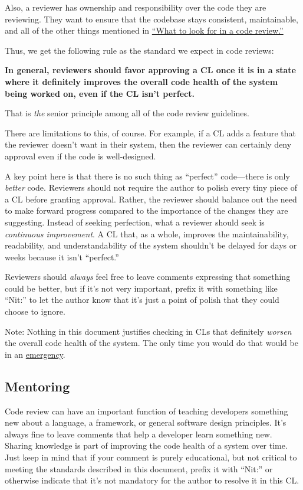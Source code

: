 \documentclass[
]{article}
\begin{document}
Also, a reviewer has ownership and responsibility over the code they are
reviewing. They want to ensure that the codebase stays consistent,
maintainable, and all of the other things mentioned in
\href{looking-for.md}{``What to look for in a code review.''}

Thus, we get the following rule as the standard we expect in code
reviews:

\textbf{In general, reviewers should favor approving a CL once it is in
a state where it definitely improves the overall code health of the
system being worked on, even if the CL isn't perfect.}

That is \emph{the} senior principle among all of the code review
guidelines.

There are limitations to this, of course. For example, if a CL adds a
feature that the reviewer doesn't want in their system, then the
reviewer can certainly deny approval even if the code is well-designed.

A key point here is that there is no such thing as ``perfect''
code---there is only \emph{better} code. Reviewers should not require
the author to polish every tiny piece of a CL before granting approval.
Rather, the reviewer should balance out the need to make forward
progress compared to the importance of the changes they are suggesting.
Instead of seeking perfection, what a reviewer should seek is
\emph{continuous improvement}. A CL that, as a whole, improves the
maintainability, readability, and understandability of the system
shouldn't be delayed for days or weeks because it isn't ``perfect.''

Reviewers should \emph{always} feel free to leave comments expressing
that something could be better, but if it's not very important, prefix
it with something like ``Nit:'' to let the author know that it's just a
point of polish that they could choose to ignore.

Note: Nothing in this document justifies checking in CLs that definitely
\emph{worsen} the overall code health of the system. The only time you
would do that would be in an \href{../emergencies.md}{emergency}.

\subsection{Mentoring}\label{mentoring}

Code review can have an important function of teaching developers
something new about a language, a framework, or general software design
principles. It's always fine to leave comments that help a developer
learn something new. Sharing knowledge is part of improving the code
health of a system over time. Just keep in mind that if your comment is
purely educational, but not critical to meeting the standards described
in this document, prefix it with ``Nit:'' or otherwise indicate that
it's not mandatory for the author to resolve it in this CL.
\end{document}

